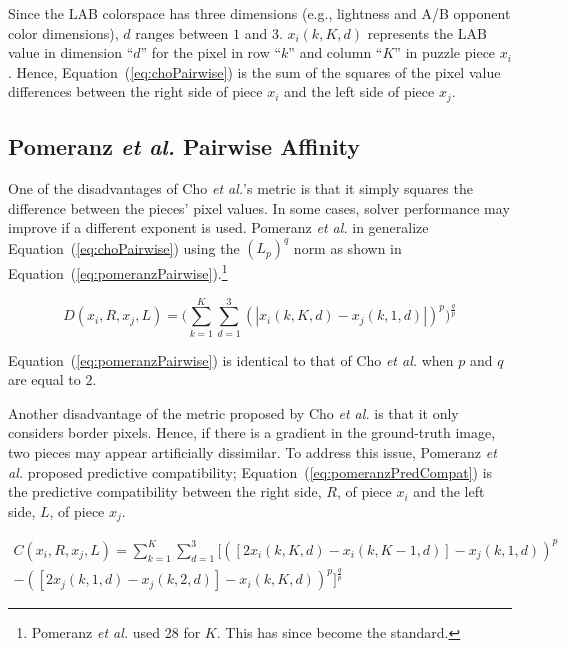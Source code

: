 \documentclass{report}
\def\eref#1{(\ref{#1})}
\begin{document}
Since the LAB colorspace has three dimensions (e.g., lightness and A/B opponent color dimensions), $d$ ranges between $1$ and $3$.  $x_i(k,K,d)$ represents the LAB value in dimension ``$d$'' for the pixel in row ``$k$'' and column ``$K$'' in puzzle piece $x_i$.  Hence, Equation~\eref{eq:choPairwise} is the sum of the squares of the pixel value differences between the right side of piece $x_i$ and the left side of piece $x_j$.

\subsection{Pomeranz \textit{et al.} Pairwise Affinity}\label{sec:pomeranzPairwiseAffinity}

One of the disadvantages of Cho \textit{et al.}'s metric is that it simply squares the difference between the pieces' pixel values.  In some cases, solver performance may improve if a different exponent is used.  Pomeranz \textit{et al.} in \cite{pomeranz2011} generalize Equation~\eref{eq:choPairwise} using the $(L_{p})^{q}$ norm as shown in Equation~\eref{eq:pomeranzPairwise}.\footnote{Pomeranz \textit{et al.} used 28 for $K$.  This has since become the standard.}

\begin{equation} \label{eq:pomeranzPairwise}
D(x_i,R,x_j,L) = \bigg(\sum_{k=1}^{K}\sum_{d=1}^{3}(|x_i(k,K,d) - x_j(k,1,d)|)^p\bigg)^{\frac{q}{p}}
\end{equation}

\noindent
Equation~\eref{eq:pomeranzPairwise} is identical to that of Cho \textit{et al.} when $p$ and $q$ are equal to $2$.

Another disadvantage of the metric proposed by Cho \textit{et al.} is that it only considers border pixels.  Hence, if there is a gradient in the ground-truth image, two pieces may appear artificially dissimilar.  To address this issue, Pomeranz \textit{et al.} proposed predictive compatibility; Equation~\eref{eq:pomeranzPredCompat} is the predictive compatibility between the right side, $R$, of piece $x_i$ and the left side, $L$, of piece $x_j$.  

\begin{equation} \label{eq:pomeranzPredCompat}
\begin{split}
C(x_i,R,x_j,L) = \sum_{k=1}^{K}\sum_{d=1}^{3}\Big[ ([2x_i(k, K, d) - x_i(k, K-1, d)] - x_j(k, 1, d))^p \\ - ([2x_j(k, 1, d) - x_j(k, 2, d)] - x_i(k, K, d))^p\Big]^{\frac{q}{p}}
\end{split}
\end{equation}
\end{document}
